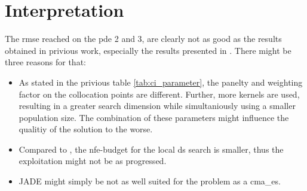\documentclass[./\jobname.tex]{subfiles}
\begin{document}
\begin{figure}[h]
	\centering
	\noindent{}
	\label{fig:serial_jade_memory_boxplot}
\end{figure}

\section{Interpretation}

The \gls{rmse} reached on the \gls{pde} 2 and 3, are clearly not as good as the results obtained in privious work, especially the results presented in \cite{chaquet_using_2019}. There might be three reasons for that: 
\begin{itemize}
	\item As stated in the privious table \ref{tab:ci_parameter}, the panelty and weighting factor on the collocation points are different. Further, more kernels are used, resulting in a greater search dimension while simultaniously using a smaller population size. The combination of these parameters might influence the qualitiy of the solution to the worse. 
	\item Compared to \cite{chaquet_using_2019}, the \gls{nfe}-budget for the local \gls{ds} search is smaller, thus the exploitation might not be as progressed.
	\item JADE might simply be not as well suited for the problem as a \gls{cma_es}. 
\end{itemize}
\end{document}
